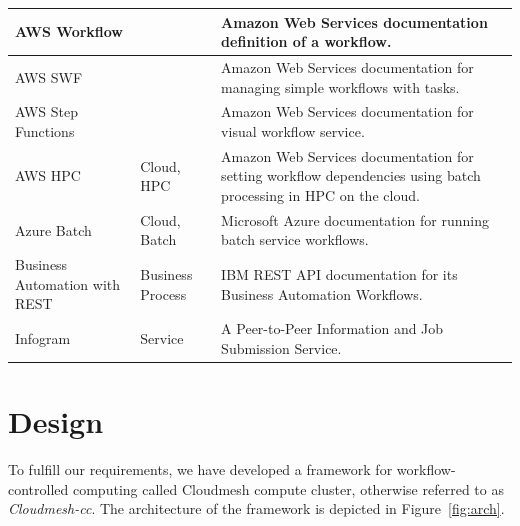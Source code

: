 \begin{table}[htb]
{{\begin{tabular}{|p{3cm}|p{3cm}|p{10cm}|}
AWS Workflow \cite{www-aws-workflow} & & Amazon Web Services documentation definition of a workflow.\\
\hline

AWS SWF \cite{www-aws-swf} & & Amazon Web Services documentation for managing simple workflows with tasks. \\
\hline

AWS Step Functions \cite{www-aws-stepfunctions} & & Amazon Web Services documentation for visual workflow service. \\
\hline

AWS HPC  \cite{www-aws-batch-workflow} & Cloud, HPC & Amazon Web Services documentation for setting workflow dependencies using batch processing in HPC on the cloud. \\
\hline

Azure Batch \cite{www-azure-batch} & Cloud, Batch & Microsoft Azure documentation for running batch service workflows. \\
  \hline

 Business Automation with REST \cite{www-business-rest-ibm} & Business
                                        Process& IBM REST API documentation for its Business Automation Workflows. \\
\hline

  


Infogram \cite{las-02-infogram} & Service & A Peer-to-Peer Information and Job Submission Service.\\
\hline
\end{tabular}
}
}
\end{table}

% 


\section{Design}

To fulfill our requirements, we have developed a framework for
workflow-controlled computing called Cloudmesh compute cluster,
otherwise referred to as
{\em Cloudmesh-cc}. The architecture of the framework is depicted in
Figure~\ref{fig:arch}.

